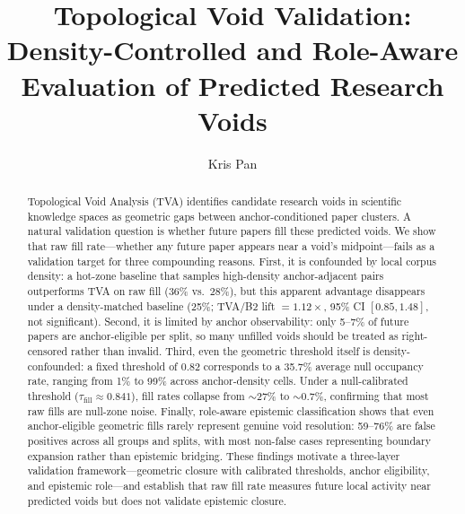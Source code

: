 \documentclass[sigconf]{acmart}
\newcommand{\tva}{\textsf{TVA}}
\newcommand{\taufill}{\tau_{\mathrm{fill}}}
\begin{document}
\title{Topological Void Validation:\\
Density-Controlled and Role-Aware Evaluation of Predicted Research Voids}

\author{Kris Pan}

\begin{abstract}
Topological Void Analysis (\tva{}) identifies candidate research voids in scientific
knowledge spaces as geometric gaps between anchor-conditioned paper clusters.
A natural validation question is whether future papers fill these predicted voids.
We show that raw fill rate---whether any future paper appears near a void's
midpoint---fails as a validation target for three compounding reasons.
First, it is confounded by local corpus density: a hot-zone baseline that samples
high-density anchor-adjacent pairs outperforms \tva{} on raw fill (36\% vs.\ 28\%),
but this apparent advantage disappears under a density-matched baseline
(25\%; \tva{}/B2 lift $= 1.12\times$, 95\% CI $[0.85, 1.48]$, not significant).
Second, it is limited by anchor observability: only 5--7\% of future papers are
anchor-eligible per split, so many unfilled voids should be treated as right-censored
rather than invalid.
Third, even the geometric threshold itself is density-confounded: a fixed threshold of
0.82 corresponds to a 35.7\% average null occupancy rate, ranging from 1\% to 99\%
across anchor-density cells.
Under a null-calibrated threshold ($\taufill \approx 0.841$), fill rates collapse from
$\sim$27\% to $\sim$0.7\%, confirming that most raw fills are null-zone noise.
Finally, role-aware epistemic classification shows that even anchor-eligible geometric
fills rarely represent genuine void resolution: 59--76\% are false positives across all
groups and splits, with most non-false cases representing boundary expansion rather than
epistemic bridging.
These findings motivate a three-layer validation framework---geometric closure with
calibrated thresholds, anchor eligibility, and epistemic role---and establish that raw
fill rate measures future local activity near predicted voids but does not validate
epistemic closure.
\end{abstract}


\maketitle
\end{document}
